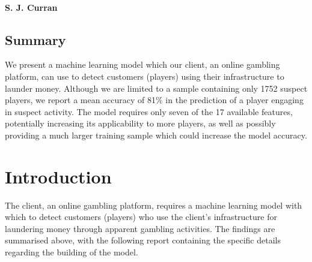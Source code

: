 \documentclass[11pt]{article} %
\begin{document}
\Large
\begin{center}
\setlength{\fboxrule}{1.5pt} 
\\
\end{center}
\large

\begin{center}
  {\bf S. J. Curran}
\end{center}

\vspace{1cm}
\normalsize


\normalsize

\begin{center}
\section*{Summary}
\end{center}

We present a machine learning model which our client, an online gambling platform, can use to detect customers (players)
using their infrastructure to launder money. Although we are limited to a sample
containing only 1752 suspect players, we
report a mean accuracy of 81\% in the prediction of a player engaging in suspect activity. The model requires
only seven of the 17 available features, potentially increasing its applicability
to more players, as well as possibly providing a much larger training sample which could increase the model accuracy.
\small

\tableofcontents

\newpage
{}
\normalsize

\pagestyle{fancy}
\fancyfoot{}
\fancyfoot[R]{\thepage} 

\section{Introduction}

The client, an online gambling platform, requires a machine learning model with which to detect customers (players)
who use the client's infrastructure for laundering money through apparent gambling activities.
The findings are summarised above, with the following report containing the specific details
regarding the building of the model.
\end{document}
